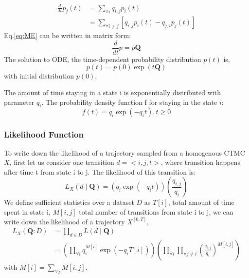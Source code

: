 \begin{equation}
\begin{split}
\frac{d}{dt} p_{j}(t) & = \sum_{\forall i} q_{i,j} p_{i}(t) \\ & = \sum_{\forall i \neq j}\left[  q_{i,j} p_{i}(t) - q_{j,i} p_{j}(t) \right]
\end{split}
\label{eq:ME}
\end{equation}
Eq.\ref{eq:ME} can be written in matrix form:
\begin{equation}
\frac{d}{dt} p = p\textbf{Q}
\end{equation}
The solution to ODE, the time-dependent probability distribution $ p(t) $ is, 
\begin{equation}
p(t)=p(0) \exp (t\textbf{Q})
\end{equation}
with initial distribution $ p(0) $.

The amount of time staying in a state i is exponentially distributed with parameter $ q_{i} $. The probability density function f for staying in the state $ i $:
\begin{equation}
f(t)=q_{i} \exp \left(-q_{i} t\right), t\geq 0
\label{eq:f(t)_homo}
\end{equation}
\subsubsection{Likelihood Function}
To write down the likelihood of a trajectory sampled from a homogenous CTMC $ X $, first let us consider one transition $ d = <i,j,t> $, where transition happens after time t from state i to j. The likelihood of this transition is:
\begin{equation}
L_{X}(d \mid \textbf{Q})=\left(q_{i} \exp \left(-q_{i} t\right)\right)\left(\frac{q_{i,j}}{q_{i}}\right)
\end{equation}
We define sufficient statistics over a dataset $ D $ as $ T[i] $, total amount of time spent in state i, $ M[i,j] $ total number of transitions from state i to j, we can write down the likelihood of a trajectory $  X^{\left[0,T\right] } $,
\begin{equation}
\begin{split}
L_{X}(\textbf{Q} : D) &=  \prod_{d \in D} L(d \mid \textbf{Q}) \\&=\left(\prod_{\forall i} q_{i}^{M[i]} \exp \left(-q_{i} T[i]\right)\right)\left(\prod_{\forall i} \prod_{\forall j \neq i} \left(\frac{q_{i,j}}{q_{i}}\right)^{M\left[i, j\right]}\right)
\label{eq:lh_traj_homo}
\end{split}
\end{equation}
with $ M[i] = \sum_{\forall j} M[i, j] $.

